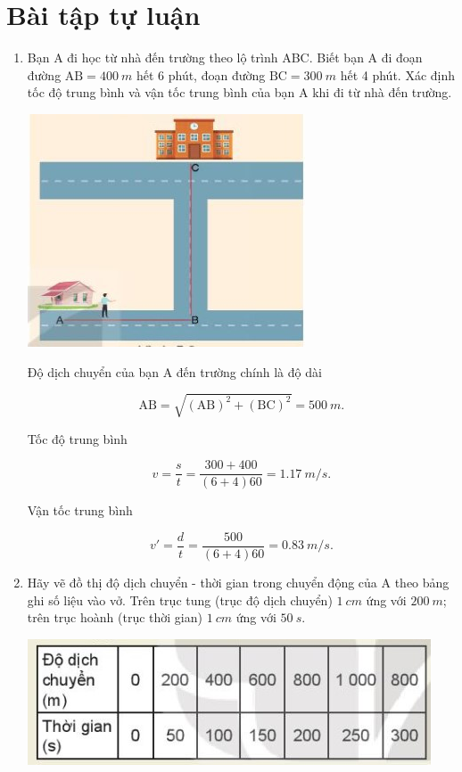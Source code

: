 \section{Bài tập tự luận}
\begin{enumerate}[label=\bfseries Bài \arabic*:]
	\item {}
	
	
	{
		Bạn A đi học từ nhà đến trường theo lộ trình ABC. Biết bạn A đi đoạn đường $\text{AB} = \SI{400}{m}$ hết 6 phút, đoạn đường $\text{BC} = \SI{300}{m}$ hết 4 phút. Xác định tốc độ trung bình và vận tốc trung bình của bạn A khi đi từ nhà đến trường.
		\begin{center}
			\includegraphics[scale=1]{../figs/VN10-2022-PH-TP005-2.jpg}
		\end{center}
	}
	\hideall
	{
		Độ dịch chuyển của bạn A đến trường chính là độ dài
		
		$$\text{AB} = \sqrt{(\text{AB})^2 + (\text{BC})^2} = \SI{500}{m}.$$
		
		Tốc độ trung bình 
		
		$$v= \dfrac{s}{t} = \dfrac{300+400}{(6 + 4)60}  = \SI{1,17}{m/s}.$$
		
		Vận tốc trung bình
		
		$$v'=\dfrac{d}{t}=\dfrac{500}{(6+4)60} = \SI{0,83}{m/s}.$$
	}

	\item {}
	
	{
		Hãy vẽ đồ thị độ dịch chuyển - thời gian trong chuyển động của A theo bảng ghi số liệu vào vở. Trên trục tung (trục độ dịch chuyển) $\SI{1}{cm}$ ứng với $\SI{200}{m}$; trên trục hoành (trục thời gian) $\SI{1}{cm}$ ứng với $\SI{50}{s}$.
		
		\begin{center}
			\includegraphics[scale=1]{../figs/VN10-2022-PH-TP006-5.jpg}
		\end{center}
		
}
\end{enumerate}
